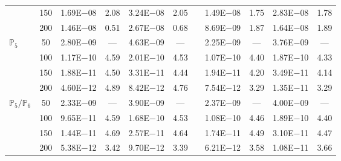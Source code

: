 \begin{table}[H]
{\begin{tabular}{@{}l c c c c c c c c c c@{}}
 & 150 & 1.69E$-$08 & 2.08  & 3.24E$-$08 & 2.05 &  & 1.49E$-$08 & 1.75 & 2.83E$-$08 & 1.78\\
 & 200 & 1.46E$-$08 & 0.51  & 2.67E$-$08 & 0.68 &  & 8.69E$-$09 & 1.87 & 1.64E$-$08 & 1.89\\
\midrule
\multirow{4}{*}{$\mathbb{P}_{5}$}
 & 50 & 2.80E$-$09 & ---  & 4.63E$-$09 & --- &  & 2.25E$-$09 & --- & 3.76E$-$09 & ---\\
 & 100 & 1.17E$-$10 & 4.59  & 2.01E$-$10 & 4.53 &  & 1.07E$-$10 & 4.40 & 1.87E$-$10 & 4.33\\
 & 150 & 1.88E$-$11 & 4.50  & 3.31E$-$11 & 4.44 &  & 1.94E$-$11 & 4.20 & 3.49E$-$11 & 4.14\\
 & 200 & 4.60E$-$12 & 4.89  & 8.42E$-$12 & 4.76 &  & 7.54E$-$12 & 3.29 & 1.35E$-$11 & 3.29\\
\midrule
\multirow{4}{*}{$\mathbb{P}_{5}/\mathbb{P}_{6}$}
 & 50 & 2.33E$-$09 & ---  & 3.90E$-$09 & --- &  & 2.37E$-$09 & --- & 4.00E$-$09 & ---\\
 & 100 & 9.65E$-$11 & 4.59  & 1.68E$-$10 & 4.53 &  & 1.08E$-$10 & 4.46 & 1.89E$-$10 & 4.40\\
 & 150 & 1.44E$-$11 & 4.69  & 2.57E$-$11 & 4.64 &  & 1.74E$-$11 & 4.49 & 3.10E$-$11 & 4.47\\
 & 200 & 5.38E$-$12 & 3.42  & 9.70E$-$12 & 3.39 &  & 6.21E$-$12 & 3.58 & 1.08E$-$11 & 3.66\\
\bottomrule
\end{tabular}}
\label{none}
\end{table}
